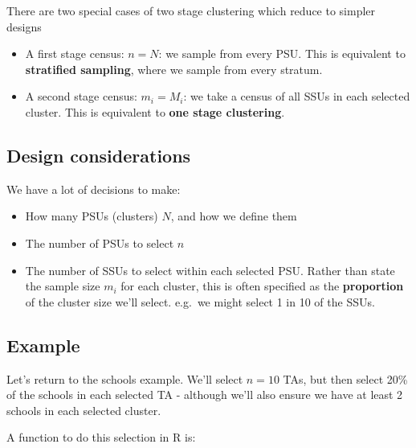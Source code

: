 \documentclass[
]{book}
\providecommand{\tightlist}{%
  \setlength{\itemsep}{0pt}\setlength{\parskip}{0pt}}
\begin{document}
There are two special cases of two stage clustering which reduce to
simpler designs

\begin{itemize}
\tightlist
\item
  A first stage census: \(n=N\): we sample from every PSU. This is equivalent
  to \textbf{stratified sampling}, where we sample from every stratum.
\item
  A second stage census: \(m_i=M_i\): we take a census of all SSUs in each selected cluster.
  This is equivalent to \textbf{one stage clustering}.
\end{itemize}

\subsection*{Design considerations}\label{design-considerations-7}

We have a lot of decisions to make:

\begin{itemize}
\tightlist
\item
  How many PSUs (clusters) \(N\), and how we define them
\item
  The number of PSUs to select \(n\)
\item
  The number of SSUs to select within each selected PSU. Rather
  than state the sample size \(m_i\) for each cluster, this is
  often specified as the \textbf{proportion} of the cluster size we'll select.
  e.g.~we might select 1 in 10 of the SSUs.
\end{itemize}

\subsection*{Example}\label{example-7}

Let's return to the schools example. We'll select \(n=10\) TAs, but then
select 20\% of the schools in each selected TA - although we'll also ensure
we have at least 2 schools in each selected cluster.

A function to do this selection in R is:
\end{document}
